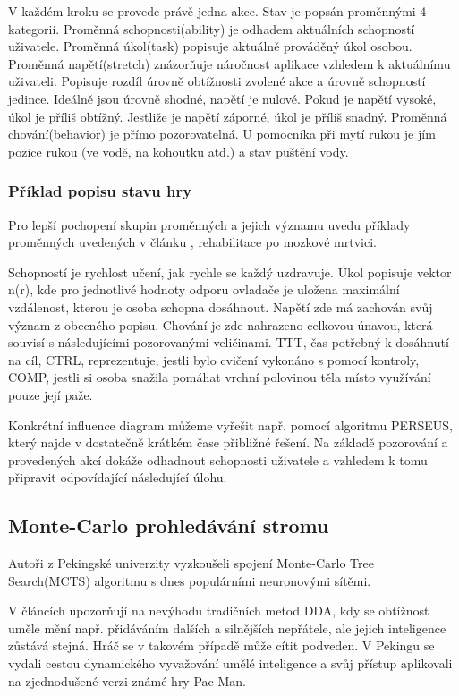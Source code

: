 V každém kroku se provede právě jedna akce. Stav je popsán proměnnými 4 kategorií. Proměnná schopnosti(ability) je odhadem aktuálních schopností uživatele. Proměnná úkol(task) popisuje aktuálně prováděný úkol osobou. Proměnná napětí(stretch) znázorňuje náročnost aplikace vzhledem k aktuálnímu uživateli. Popisuje rozdíl úrovně obtížnosti zvolené akce a úrovně schopností jedince. Ideálně jsou úrovně shodné, napětí je nulové. Pokud je napětí vysoké, úkol je příliš obtížný. Jestliže je napětí záporné, úkol je příliš snadný. Proměnná chování(behavior) je přímo pozorovatelná. U pomocníka při mytí rukou je jím pozice rukou (ve vodě, na kohoutku atd.) a stav puštění vody.

\subsubsection{Příklad popisu stavu hry}

Pro lepší pochopení skupin proměnných a jejich významu uvedu příklady proměnných uvedených v článku \cite{9Pomdp}, rehabilitace po mozkové mrtvici.

Schopností je rychlost učení, jak rychle se každý uzdravuje. Úkol popisuje vektor n(r), kde pro jednotlivé hodnoty odporu ovladače je uložena maximální vzdálenost, kterou je osoba schopna dosáhnout. Napětí zde má zachován svůj význam z obecného popisu. Chování je zde nahrazeno celkovou únavou, která souvisí s následujícími pozorovanými veličinami. TTT, čas potřebný k dosáhnutí na cíl, CTRL, reprezentuje, jestli bylo cvičení vykonáno s pomocí kontroly, COMP, jestli si osoba snažila pomáhat vrchní polovinou těla místo využívání pouze její paže.

Konkrétní influence diagram můžeme vyřešit např. pomocí algoritmu PERSEUS, který najde v dostatečně krátkém čase přibližné řešení. Na základě pozorování a provedených akcí dokáže odhadnout schopnosti uživatele a vzhledem k tomu připravit odpovídající následující úlohu.

\subsection{Monte-Carlo prohledávání stromu}

Autoři z Pekingské univerzity vyzkoušeli spojení Monte-Carlo Tree Search(MCTS) algoritmu s dnes populárními neuronovými sítěmi. \cite{18Pac1}\cite{19Pac2}

V článcích upozorňují na nevýhodu tradičních metod DDA, kdy se obtížnost uměle mění např. přidáváním dalších a silnějších nepřátele, ale jejich inteligence zůstává stejná. Hráč se v takovém případě může cítit podveden. V Pekingu se vydali cestou dynamického vyvažování umělé inteligence a svůj přístup aplikovali na zjednodušené verzi známé hry Pac-Man.

